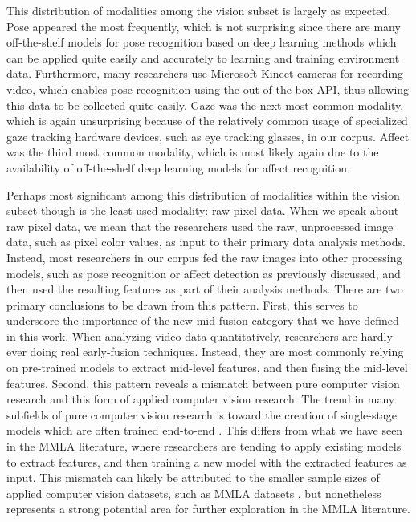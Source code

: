 \documentclass[manuscript,screen,review]{acmart}
\begin{document}
This distribution of modalities among the vision subset is largely as expected. Pose appeared the most frequently, which is not surprising since there are many off-the-shelf models for pose recognition based on deep learning methods which can be applied quite easily and accurately to learning and training environment data. Furthermore, many researchers use Microsoft Kinect cameras for recording video, which enables pose recognition using the out-of-the-box API, thus allowing this data to be collected quite easily. Gaze was the next most common modality, which is again unsurprising because of the relatively common usage of specialized gaze tracking hardware devices, such as eye tracking glasses, in our corpus. Affect was the third most common modality, which is most likely again due to the availability of off-the-shelf deep learning models for affect recognition. 

Perhaps most significant among this distribution of modalities within the vision subset though is the least used modality: raw pixel data. When we speak about raw pixel data, we mean that the researchers used the raw, unprocessed image data, such as pixel color values, as input to their primary data analysis methods. Instead, most researchers in our corpus fed the raw images into other processing models, such as pose recognition or affect detection as previously discussed, and then used the resulting features as part of their analysis methods. There are two primary conclusions to be drawn from this pattern. First, this serves to underscore the importance of the new mid-fusion category that we have defined in this work. When analyzing video data quantitatively, researchers are hardly ever doing real early-fusion techniques. Instead, they are most commonly relying on pre-trained models to extract mid-level features, and then fusing the mid-level features. Second, this pattern reveals a mismatch between pure computer vision research and this form of applied computer vision research. The trend in many subfields of pure computer vision research is toward the creation of single-stage models which are often trained end-to-end \cite{carranza2021}. This differs from what we have seen in the MMLA literature, where researchers are tending to apply existing models to extract features, and then training a new model with the extracted features as input. This mismatch can likely be attributed to the smaller sample sizes of applied computer vision datasets, such as MMLA datasets \cite{sharma_multimodal_2020}, but nonetheless represents a strong potential area for further exploration in the MMLA literature.
\end{document}

